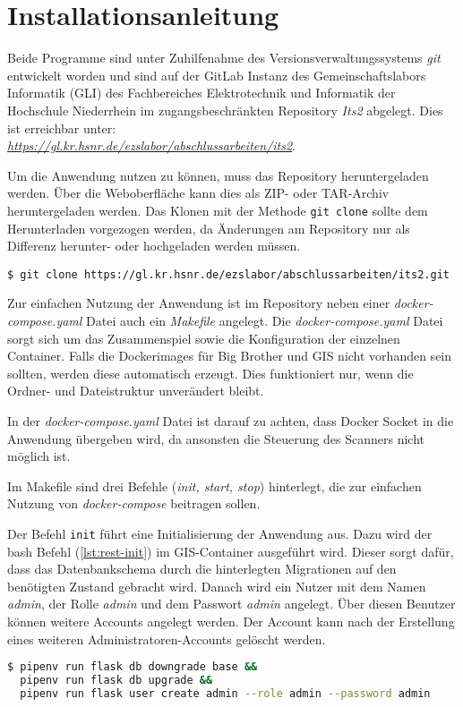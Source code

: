 \section{Installationsanleitung}
Beide Programme sind unter Zuhilfenahme des Versionsverwaltungssystems \textit{git} entwickelt worden und sind auf der GitLab Instanz des Gemeinschaftslabors Informatik (GLI) des Fachbereiches Elektrotechnik und Informatik der Hochschule Niederrhein im zugangsbeschränkten Repository \textit{Its2} abgelegt. Dies ist erreichbar unter: \\ \textit{\url{https://gl.kr.hsnr.de/ezslabor/abschlussarbeiten/its2}}.

Um die Anwendung nutzen zu können, muss das Repository heruntergeladen werden.
Über die Weboberfläche kann dies als ZIP- oder TAR-Archiv heruntergeladen werden. Das Klonen mit der Methode \texttt{git clone} sollte dem Herunterladen vorgezogen werden, da Änderungen am Repository nur als Differenz herunter- oder hochgeladen werden müssen.

\begin{lstlisting}[caption={git clone (bash)}, captionpos=b, label={lst:git-clone}]
$ git clone https://gl.kr.hsnr.de/ezslabor/abschlussarbeiten/its2.git
\end{lstlisting}

Zur einfachen Nutzung der Anwendung ist im Repository neben einer \textit{docker-compose.yaml} Datei auch ein \textit{Makefile} angelegt. Die \textit{docker-compose.yaml} Datei sorgt sich um das Zusammenspiel sowie die Konfiguration der einzelnen Container. Falls die Dockerimages für Big Brother und GIS nicht vorhanden sein sollten, werden diese automatisch erzeugt. Dies funktioniert nur, wenn die Ordner- und Dateistruktur unverändert bleibt.

In der \textit{docker-compose.yaml} Datei ist darauf zu achten, dass Docker Socket in die Anwendung übergeben wird, da ansonsten die Steuerung des Scanners nicht möglich ist.

Im Makefile sind drei Befehle (\textit{init, start, stop}) hinterlegt, die zur einfachen Nutzung von \textit{docker-compose} beitragen sollen.

Der Befehl \texttt{init} führt eine Initialisierung der Anwendung aus. Dazu wird der bash Befehl (\autoref{lst:rest-init}) im GIS-Container ausgeführt wird. Dieser sorgt dafür, dass das Datenbankschema durch die hinterlegten Migrationen auf den benötigten Zustand gebracht wird. Danach wird ein Nutzer mit dem Namen \textit{admin}, der Rolle \textit{admin} und dem Passwort \textit{admin} angelegt. Über diesen Benutzer können weitere Accounts angelegt werden. Der Account kann nach der Erstellung eines weiteren Administratoren-Accounts gelöscht werden.
\begin{lstlisting}[language=bash, caption={Initialisierung REST-Interface (bash)}, captionpos=b, label={lst:rest-init}]
$ pipenv run flask db downgrade base && 
  pipenv run flask db upgrade && 
  pipenv run flask user create admin --role admin --password admin
\end{lstlisting}

